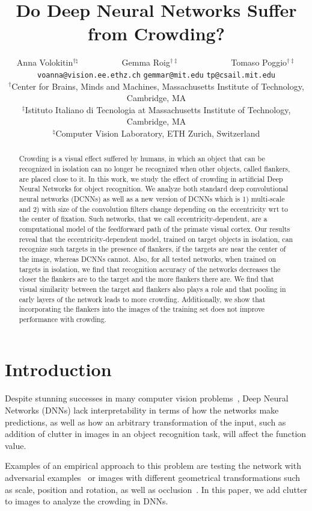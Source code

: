 \documentclass{article}
\title{Do Deep Neural Networks Suffer from Crowding?}
\author{
  Anna Volokitin$^{\dagger\natural}$ \,\,\,\,\,\,\,\,\,\,\,\,\,\,\,\,\,\,\,\,\,\,\,\,\,\,\, Gemma Roig$^{\dagger\ddagger}$ \,\,\,\,\,\,\,\,\,\,\,\,\,\,\,\,\,\,\,\,\,\,\,\,\,\,\,\,\,\,\,\,\, Tomaso Poggio$^{\dagger\ddagger}$ \\
\hspace*{-1cm}    \texttt{voanna@vision.ee.ethz.ch} \hspace*{0.5cm} \texttt{gemmar@mit.edu} \hspace*{1.5cm} \texttt{tp@csail.mit.edu}\\
 $^\dagger$Center for Brains, Minds and Machines, Massachusetts Institute of Technology, Cambridge, MA  \\
$^\ddagger$Istituto Italiano di Tecnologia at Massachusetts Institute of Technology, Cambridge, MA \\
$^\natural$Computer Vision Laboratory, ETH Zurich, Switzerland
}
\begin{document}


\maketitle

\begin{abstract}
  Crowding is a visual effect suffered by humans, in which an object
  that can be recognized in isolation can no longer be recognized when
  other objects, called flankers, are placed close to it.  In this
  work, we study the effect of crowding in artificial Deep Neural
  Networks for object recognition.  We analyze both standard deep
  convolutional neural networks (DCNNs) as well as a new version of
  DCNNs which is 1) multi-scale and 2) with size of the convolution
  filters change depending on the eccentricity wrt to the center of
  fixation. Such networks, that we call eccentricity-dependent, are a
  computational model of the feedforward path of the primate visual
  cortex.  Our results reveal that the eccentricity-dependent model,
  trained on target objects in isolation, can recognize such targets
  in the presence of flankers, if the targets are near the center of
  the image, whereas DCNNs cannot.  Also, for all tested networks,
  when trained on targets in isolation, we find that recognition
  accuracy of the networks decreases the closer the flankers are to
  the target and the more flankers there are. We find that visual
  similarity between the target and flankers also plays a role and
  that pooling in early layers of the network leads to more crowding.
  Additionally, we show that incorporating the flankers into the
  images of the training set does not improve performance with
  crowding.
\end{abstract}

\section{Introduction}\vspace*{-0.15cm}
Despite stunning successes in many computer vision problems~\cite{AlexNet,VGG,GoogleNet,ResNet,ren2015faster}, Deep Neural Networks (DNNs) lack interpretability in terms of how the networks make predictions, as well as how an arbitrary transformation of the input, such as addition of clutter in images in an object recognition task, will affect the function value.



Examples of an empirical approach to this problem are testing the network with adversarial examples~\cite{goodfellow2014explaining, foveationadversarials} or images with different geometrical transformations such as scale, position and rotation, as well as occlusion~\cite{zeiler2014visualizing}.  In this paper, we add clutter to images to analyze the crowding in DNNs. 
\end{document}

